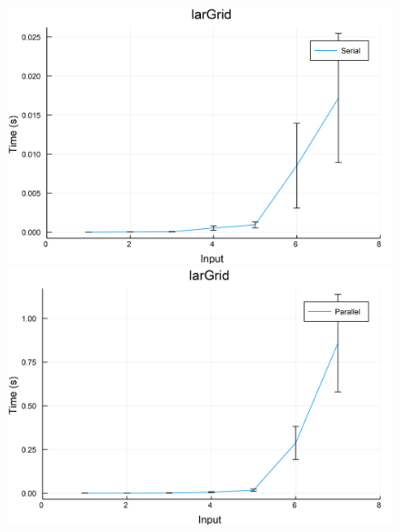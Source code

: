 \documentclass{article}
\begin{document}
\begin{figure}[h!]
\centering
\includegraphics[scale=0.06]{larGridSer.png}
\includegraphics[scale=0.06]{larGridPar.png}
\end{figure}
\end{document}
